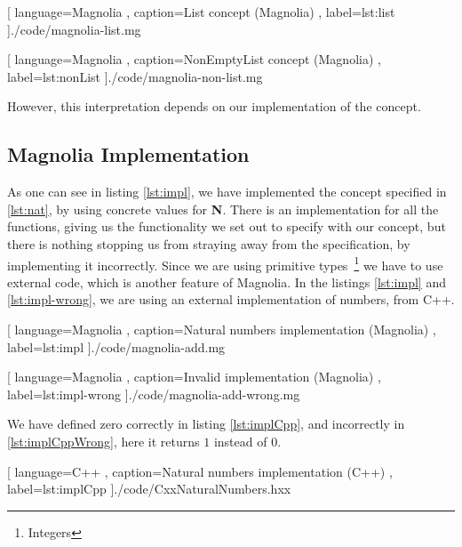 \begin{center}
  
    [ language=Magnolia
    , caption={List concept (Magnolia)}
    , label=lst:list
    ]{./code/magnolia-list.mg}
\end{center}

\begin{center}
  
    [ language=Magnolia
    , caption={NonEmptyList concept (Magnolia)}
    , label=lst:nonList
    ]{./code/magnolia-non-list.mg}
\end{center}

However, this interpretation depends on our implementation of the concept.

\subsection{Magnolia Implementation}

As one can see in listing \ref{lst:impl}, we have implemented the concept
specified in \ref{lst:nat}, by using concrete values for \textbf{N}. There is an
implementation for all the functions, giving us the functionality we set out to
specify with our concept, but there is nothing stopping us from straying away
from the specification, by implementing it incorrectly. Since we are using
primitive types~\footnote{Integers} we have to use external code, which is
another feature of Magnolia. In the listings \ref{lst:impl} and
\ref{lst:impl-wrong}, we are using an external implementation of numbers, from
C++.

\begin{code}[]
  
    [ language=Magnolia
    , caption={Natural numbers implementation (Magnolia)}
    , label=lst:impl
    ]{./code/magnolia-add.mg}
\end{code}

\begin{code}[]
  
    [ language=Magnolia
    , caption={Invalid implementation (Magnolia)}
    , label=lst:impl-wrong
    ]{./code/magnolia-add-wrong.mg}
\end{code}

We have defined zero correctly in listing \ref{lst:implCpp}, and incorrectly in
\ref{lst:implCppWrong}, here it returns $1$ instead of $0$.

\begin{code}[H]
  
    [ language=C++
    , caption={Natural numbers implementation (C++)}
    , label=lst:implCpp
    ]{./code/CxxNaturalNumbers.hxx}
\end{code}

